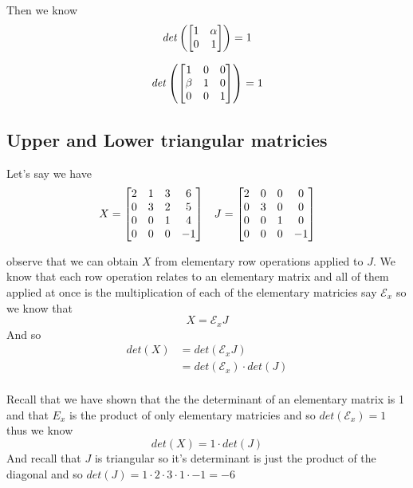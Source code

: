 \documentclass[11pt]{book}
\begin{document}
\begin{eg}
    Then we know 
    \[
    \mathit{det} \left(\mat[b]{ 1 & \alpha  \\ 0 & 1 }\right) = 1
    \]
\end{eg}

\begin{eg}
    \[
    \mathit{det} \left(\mat[b]{ 1 & 0 & 0 \\ \beta  & 1 & 0 \\ 0 & 0 & 1 }\right) = 1
    \]
\end{eg}

\subsection{Upper and Lower triangular matricies}%
\label{sub:upper_and_lower_triangular_matricies}

Let's say we have 
\begin{align*}
    X= \mat[b]{ 2 & 1 & 3 & 6 \\ 0 & 3 & 2 & 5 \\ 0 & 0 & 1 & 4 \\ 0 & 0 & 0 & -1 } && J= \mat[b]{ 2 & 0 & 0 & 0 \\ 0 & 3 & 0 & 0 \\ 0 & 0 & 1 & 0 \\ 0 & 0 & 0 & -1 }
\end{align*}

observe that we can obtain $X$ from elementary row operations applied to $J$. We know that each row operation relates to an elementary matrix and all of them applied at once is the multiplication of each of the elementary matricies say $\mathcal{E} _{x} $ so we know that
\[
X= \mathcal{E} _{x} J
\]
And so 
\begin{align*}
    \mathit{det} \left(X\right) &= \mathit{det} \left(\mathcal{E} _{x} J\right)   \\ 
    &= \mathit{det} \left(\mathcal{E} _{x} \right)  \cdot \mathit{det} \left(J\right)   \\ 
\end{align*}

Recall that we have shown that the the determinant of an elementary matrix is 1 and that $E_{x} $ is the product of only elementary matricies and so $\mathit{det} \left(\mathcal{E }_{x}  \right) = 1$ thus we know 
\[
\mathit{det} \left(X\right) = 1  \cdot \mathit{det} \left(J\right) 
\]
And recall that $J$ is triangular so it's determinant is just the product of the diagonal and so $\mathit{det} \left(J\right) = 1 \cdot 2 \cdot 3 \cdot 1  \cdot -1 = -6$  
\end{document}

